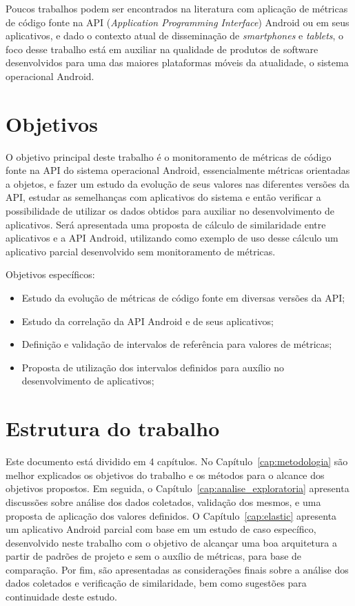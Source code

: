 Poucos trabalhos podem ser encontrados na literatura com aplicação de métricas de código fonte na API (\textit{Application Programming Interface}) Android ou em seus aplicativos, e dado o contexto atual de disseminação de \textit{smartphones} e \textit{tablets}, o foco desse trabalho está em auxiliar na qualidade de produtos de software desenvolvidos para uma das maiores plataformas móveis da atualidade, o sistema operacional Android. 

\section{Objetivos}

O objetivo principal deste trabalho é o monitoramento de métricas de código fonte na API do sistema operacional Android, essencialmente métricas orientadas a objetos, e fazer um estudo da evolução de seus valores nas diferentes versões da API, estudar as semelhanças com aplicativos do sistema e então verificar a possibilidade de utilizar os dados obtidos para auxiliar no desenvolvimento de aplicativos. Será apresentada uma proposta de cálculo de similaridade entre aplicativos e a API Android, utilizando como exemplo de uso desse cálculo um aplicativo parcial desenvolvido sem monitoramento de métricas.

Objetivos específicos:
\begin{itemize}
\item Estudo da evolução de métricas de código fonte em diversas versões da API;
\item Estudo da correlação da API Android e de seus aplicativos;
\item Definição e validação de intervalos de referência para valores de métricas;
\item Proposta de utilização dos intervalos definidos para auxílio no desenvolvimento de aplicativos;
\end{itemize}

\section{Estrutura do trabalho}

Este documento está dividido em 4 capítulos. No Capítulo~\ref{cap:metodologia} são melhor explicados os objetivos do trabalho e os métodos para o alcance dos objetivos propostos. Em seguida, o Capítulo~\ref{cap:analise_exploratoria} apresenta discussões sobre análise dos dados coletados, validação dos mesmos, e uma proposta de aplicação dos valores definidos. O Capítulo~\ref{cap:elastic} apresenta um aplicativo Android parcial com base em um estudo de caso específico, desenvolvido neste trabalho com o objetivo de alcançar uma boa arquitetura a partir de padrões de projeto e sem o auxílio de métricas, para base de comparação. Por fim, são apresentadas as considerações finais sobre a análise dos dados coletados e verificação de similaridade, bem como sugestões para continuidade deste estudo.
